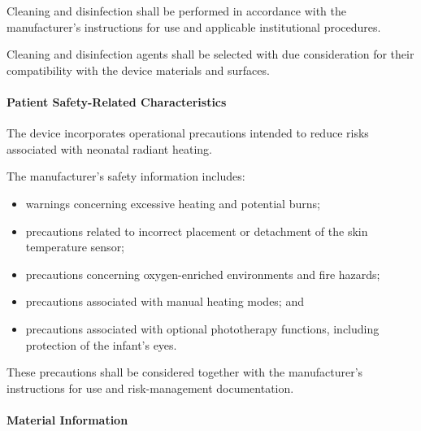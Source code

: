 Cleaning and disinfection shall be performed in accordance
with the manufacturer's instructions for use and applicable
institutional procedures.

Cleaning and disinfection agents shall be selected with due
consideration for their compatibility with the device materials
and surfaces.


\paragraph{Patient Safety-Related Characteristics}

The device incorporates operational precautions intended to
reduce risks associated with neonatal radiant heating.

The manufacturer's safety information includes:

\begin{itemize}
    \item warnings concerning excessive heating and potential burns;
    \item precautions related to incorrect placement or detachment
    of the skin temperature sensor;
    \item precautions concerning oxygen-enriched environments
    and fire hazards;
    \item precautions associated with manual heating modes; and
    \item precautions associated with optional phototherapy
    functions, including protection of the infant's eyes.
\end{itemize}

These precautions shall be considered together with the
manufacturer's instructions for use and risk-management
documentation.





\paragraph{Material Information}

